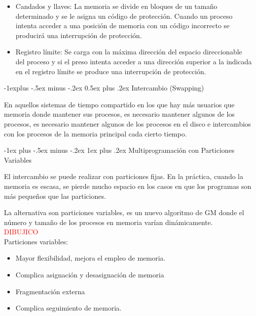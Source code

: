 \documentclass[10pt,portrait, twocolumn]{article}
\makeatletter
\renewcommand{\subsection}{\@startsection{subsection}{2}{0mm}%
                                {-1explus -.5ex minus -.2ex}%
                                {0.5ex plus .2ex}%
                                {\normalfont\normalsize\bfseries}}
\renewcommand{\subsubsection}{\@startsection{subsubsection}{3}{0mm}%
                                {-1ex plus -.5ex minus -.2ex}%
                                {1ex plus .2ex}%
                                {\normalfont\small\bfseries}}
\makeatother
\begin{document}
	\begin{itemize}
	\item Candados y llaves: La memoria se divide en bloques de un tamaño determinado y se le asigna un código de protección. Cuando un proceso intenta acceder a una posición de memoria con un código incorrecto se producirá una interrupción de protección.
	\item Registro límite: Se carga con la máxima dirección del espacio direccionable del proceso y si el preso intenta acceder a una dirección superior a la indicada en el registro límite se produce una interrupción de protección.
	\end{itemize}
	
\subsection{Intercambio (Swapping)}

En aquellos sistemas de tiempo compartido en los que hay más usuarios que memoria donde mantener sus procesos, es necesario mantener algunos de los procesos, es necesario mantener algunos de los procesos en el disco e intercambios con los procesos de la memoria principal cada cierto tiempo.

\subsubsection{Multiprogramación con Particiones Variables}

El intercambio se puede realizar con particiones fijas. En la práctica, cuando la memoria es escasa, se pierde mucho espacio en los casos en que los programas son más pequeños que las particiones.

\quad La alternativa son particiones variables, es un nuevo algoritmo de GM donde el número y tamaño de los procesos en memoria varían dinámicamente.\\

\textcolor{red}{DIBUJICO}\\

Particiones variables:

	\begin{itemize}
	\item Mayor flexibilidad, mejora el empleo de memoria.
	\item Complica asignación y desasignación de memoria
	\item Fragmentación externa
	\item Complica seguimiento de memoria.
	\end{itemize}
	
\end{document}
